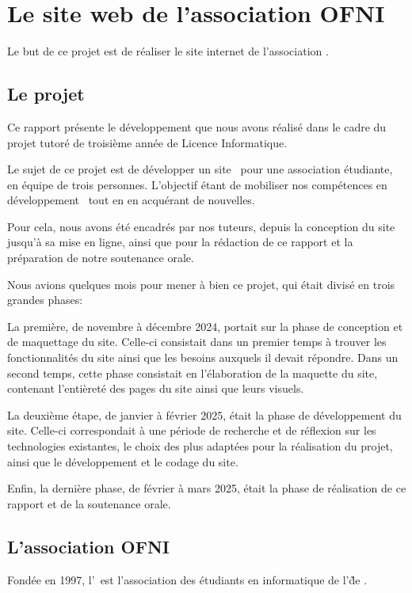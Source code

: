 \chapter{Le site web de l'association OFNI}
\label{chap:site}

Le but de ce projet est de réaliser le site internet de l'association \ofni.

\section{Le projet}

Ce rapport présente le développement que nous avons réalisé dans le cadre du projet tutoré de troisième année de Licence Informatique.
\bigskip

Le sujet de ce projet est de développer un site \web\ pour une association étudiante, en équipe de trois personnes. L'objectif étant de mobiliser nos compétences en développement \web\ tout en en acquérant de nouvelles.

Pour cela, nous avons été encadrés par nos tuteurs, depuis la conception du site jusqu'à sa mise en ligne, ainsi que pour la rédaction de ce rapport et la préparation de notre soutenance orale.
\bigskip

Nous avions quelques mois pour mener à bien ce projet, qui était divisé en trois grandes phases:

La première, de novembre à décembre 2024, portait sur la phase de conception et de maquettage du site. 
Celle-ci consistait dans un premier temps à trouver les fonctionnalités du site ainsi que les besoins auxquels il devait répondre. 
Dans un second temps, cette phase consistait en l'élaboration de la maquette du site, contenant l'entièreté des pages du site ainsi que leurs visuels.

La deuxième étape, de janvier à février 2025, était la phase de développement du site. 
Celle-ci correspondait à une période de recherche et de réflexion sur les technologies existantes, le choix des plus adaptées pour la réalisation du projet, ainsi que le développement et le codage du site.

Enfin, la dernière phase, de février à mars 2025, était la phase de réalisation de ce rapport et de la soutenance orale.

\section{L'association OFNI}

Fondée en 1997, l'\ofni\ est l'association des étudiants en informatique de l'\univ\~ de .
\bigskip

